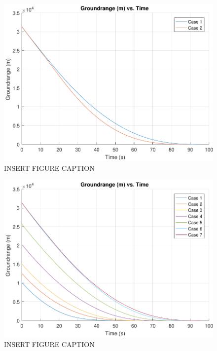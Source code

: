 \begin{figure}[H]
	\centering
	\begin{minipage}{4.5 in}
		\includegraphics[width=\linewidth]{Figures/rngatmovsvac.pdf}
		\caption{INSERT FIGURE CAPTION \label{fig:rngatmovsvac} }
	\end{minipage}
\end{figure}



\begin{figure}[H]
	\centering
	\begin{minipage}{4.5 in}
		\includegraphics[width=\linewidth]{Figures/rngpowatmo.pdf}
		\caption{INSERT FIGURE CAPTION \label{fig:rngpowatmo} }
	\end{minipage}
\end{figure}











